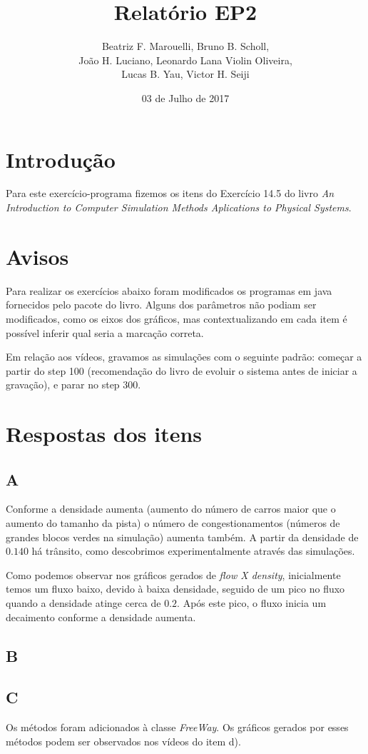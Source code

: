 \documentclass[a4paper, 12pt]{article}
\title{Relatório EP2}
\author{Beatriz F. Marouelli, Bruno B. Scholl, \\João H. Luciano, Leonardo Lana Violin Oliveira, \\ Lucas B. Yau, Victor H. Seiji}
\date{03 de Julho de 2017}
\begin{document}
\maketitle

\section*{Introdução}
Para este exercício-programa fizemos os itens do Exercício 14.5 do livro
\textit{An Introduction to Computer Simulation Methods Aplications to Physical
Systems}.

\section*{Avisos}
Para realizar os exercícios abaixo foram modificados os programas em java fornecidos
pelo pacote do livro. Alguns dos parâmetros não podiam ser modificados, como os eixos
dos gráficos, mas contextualizando em cada item é possível inferir qual seria a marcação
correta.

Em relação aos vídeos, gravamos as simulações com o seguinte padrão: começar a partir do
step 100 (recomendação do livro de evoluir o sistema antes de iniciar a gravação), e parar
no step 300.

\section*{Respostas dos itens}
\subsection*{A}
Conforme a densidade aumenta (aumento do número de carros maior que o aumento do
tamanho da pista) o número de congestionamentos (números de grandes blocos verdes 
na simulação) aumenta também. A partir da densidade de $0.140$ há trânsito, como 
descobrimos experimentalmente através das simulações.

Como podemos observar nos gráficos gerados de \textit{flow X density},
inicialmente temos um fluxo baixo, devido à baixa densidade, seguido de
um pico no fluxo quando a densidade atinge cerca de $0.2$. Após este pico,
o fluxo inicia um decaimento conforme a densidade aumenta.  
\subsection*{B}

\subsection*{C}
Os métodos foram adicionados à classe \textit{FreeWay}. Os gráficos gerados 
por esses métodos podem ser observados nos vídeos do item d).
\end{document}
